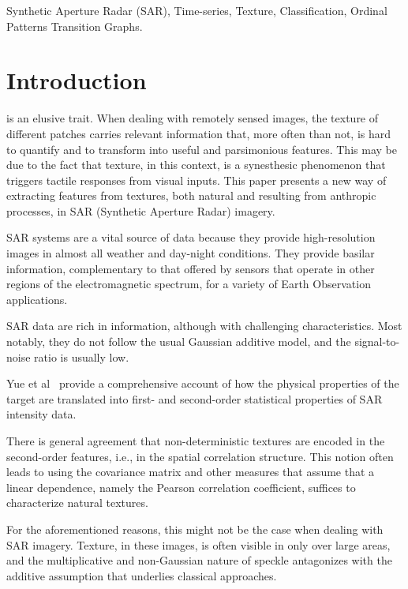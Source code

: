 \documentclass[journal]{IEEEtran}
\begin{document}
\begin{IEEEkeywords}
Synthetic Aperture Radar (SAR), 
Time-series, 
Texture, 
Classification, 
Ordinal Patterns Transition Graphs.
\end{IEEEkeywords}

\IEEEpeerreviewmaketitle

\section{Introduction}

 is an elusive trait.
When dealing with remotely sensed images, the texture of different patches carries relevant information that, more often than not, is hard to quantify and to transform into useful and parsimonious features.
This may be due to the fact that texture, in this context, is a synesthesic phenomenon that triggers tactile responses from visual inputs.
This paper presents a new way of extracting features from textures, both natural and resulting from anthropic processes, in SAR (Synthetic Aperture Radar) imagery.

SAR systems are a vital source of data because they provide high-resolution images in almost all weather and day-night conditions.
They provide basilar information, complementary to that offered by sensors that operate in other regions of the electromagnetic spectrum, for a variety of Earth Observation applications.

SAR data are rich in information, although with challenging characteristics.
Most notably, they do not follow the usual Gaussian additive model, and the signal-to-noise ratio is usually low.

Yue et al~\cite{AGeneralizedGaussianCoherentScattererModelforCorrelatedSARTexture} provide a comprehensive account of how the physical properties of the target are translated into first- and second-order statistical properties of SAR intensity data.

There is general agreement that non-deterministic textures are encoded in the second-order features, i.e., in the spatial correlation structure.
This notion often leads to using the covariance matrix and other measures that assume that a linear dependence, namely the Pearson  correlation coefficient, suffices to characterize natural textures.

For the aforementioned reasons, this might not be the case when dealing with SAR imagery.
Texture, in these images, is often visible in only over large areas, and the multiplicative and non-Gaussian nature of speckle antagonizes with the additive assumption that underlies classical approaches.
\end{document}
